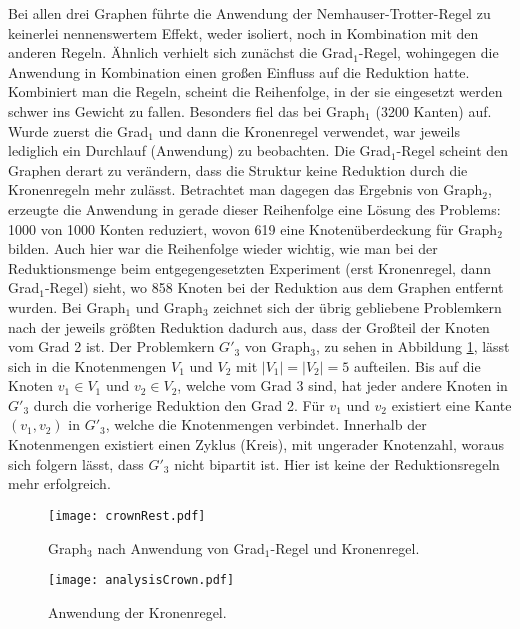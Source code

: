 Bei allen drei Graphen führte die Anwendung der Nemhauser-Trotter-Regel zu keinerlei nennenswertem Effekt, weder isoliert, noch in Kombination mit den anderen Regeln. Ähnlich verhielt sich zunächst die Grad$_{1}$-Regel, wohingegen die Anwendung in Kombination einen großen Einfluss auf die Reduktion hatte. Kombiniert man die Regeln, scheint die Reihenfolge, in der sie eingesetzt werden schwer ins Gewicht zu fallen. Besonders fiel das bei Graph$_{1}$ (3200 Kanten) auf. Wurde zuerst die Grad$_{1}$ und dann die Kronenregel verwendet, war jeweils lediglich ein Durchlauf (Anwendung) zu beobachten. Die Grad$_{1}$-Regel scheint den Graphen derart zu verändern, dass die Struktur keine Reduktion durch die Kronenregeln mehr zulässt. Betrachtet man dagegen das Ergebnis von Graph$_{2}$, erzeugte die Anwendung in gerade dieser Reihenfolge eine Lösung des Problems: 1000 von 1000 Konten reduziert, wovon 619 eine Knotenüberdeckung für Graph$_{2}$ bilden. Auch hier war die Reihenfolge wieder wichtig, wie man bei der Reduktionsmenge beim entgegengesetzten Experiment (erst Kronenregel, dann Grad$_{1}$-Regel) sieht, wo 858 Knoten bei der Reduktion aus dem Graphen entfernt wurden. Bei Graph$_{1}$ und Graph$_{3}$ zeichnet sich der übrig gebliebene Problemkern nach der jeweils größten Reduktion dadurch aus, dass der Großteil der Knoten vom Grad 2 ist. Der Problemkern $G'_{3}$ von Graph$_{3}$, zu sehen in  Abbildung \ref{fig:crownRest}, lässt sich in die Knotenmengen $V_{1}$ und $V_{2}$  mit $|V_{1}| = |V_{2}| = 5$ aufteilen. Bis auf die Knoten $v_{1} \in V_{1}$ und $v_{2} \in V_{2}$, welche vom Grad 3 sind, hat jeder andere Knoten in  $G'_{3}$ durch die vorherige Reduktion den Grad 2. Für  $v_{1}$ und $v_{2}$ existiert eine Kante $(v_{1}, v_{2})$ in $G'_{3}$, welche die Knotenmengen verbindet. Innerhalb der Knotenmengen existiert einen Zyklus (Kreis), mit ungerader Knotenzahl, woraus sich folgern lässt, dass $G'_{3}$ nicht bipartit ist. Hier ist keine der Reduktionsregeln mehr erfolgreich.
\begin{figure}[htb]
\centering
  	{\texttt{[image: crownRest.pdf]}}
	\caption{Graph$_{3}$ nach Anwendung von Grad$_{1}$-Regel und Kronenregel.\label{fig:crownRest}}
\centering
\end{figure}

\begin{figure}[htb]
\centering
  	{\texttt{[image: analysisCrown.pdf]}}
	\caption{Anwendung der Kronenregel.\label{fig:crown}}
\centering
\end{figure}


